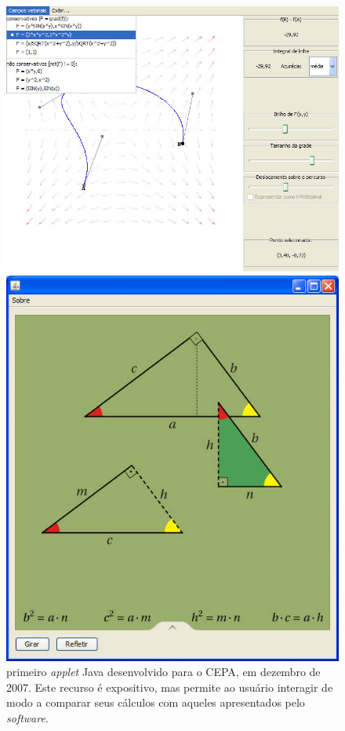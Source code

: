 \documentclass[a4paper,10pt]{scrartcl}					%
\newcommand\foreign[1]{\textsl{#1}}
\begin{document}
	\begin{figure}
		\centering
		\begin{minipage}[b]{0.46\textwidth}
			\includegraphics[width=\textwidth]{images/campo-vetorial.jpg}
			\caption{primeiro \foreign{applet} Java desenvolvido para o CEPA, em dezembro de 2007. Este recurso é expositivo, mas permite ao usuário interagir de modo a comparar seus cálculos com aqueles apresentados pelo \foreign{software}.}
			\label{fig:campo}
		\end{minipage}\hfill
		\begin{minipage}[b]{0.46\textwidth}
			\includegraphics[width=\textwidth]{images/triangulo-retangulo.jpg}

\end{minipage}
\end{figure}
\end{document}
